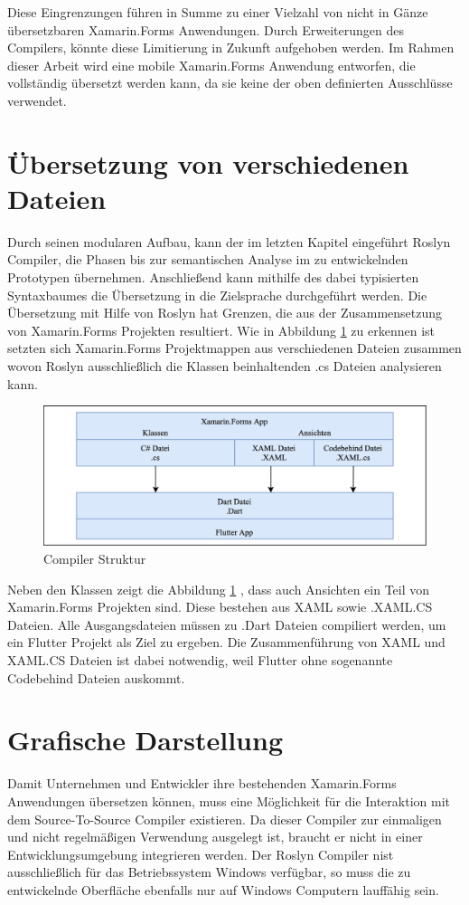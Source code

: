Diese Eingrenzungen führen in Summe zu einer Vielzahl von nicht in Gänze übersetzbaren Xamarin.Forms Anwendungen.  Durch Erweiterungen des Compilers, könnte diese Limitierung in Zukunft aufgehoben werden.  Im Rahmen dieser Arbeit wird eine mobile Xamarin.Forms Anwendung entworfen, die vollständig übersetzt werden kann, da sie keine der oben definierten Ausschlüsse verwendet. 


\section{Übersetzung von verschiedenen Dateien}
Durch seinen modularen Aufbau,  kann der im letzten Kapitel eingeführt Roslyn Compiler,  die Phasen bis zur semantischen Analyse im zu entwickelnden Prototypen übernehmen.  Anschließend kann mithilfe des dabei typisierten Syntaxbaumes die Übersetzung in die Zielsprache durchgeführt werden.   Die Übersetzung mit Hilfe von Roslyn hat Grenzen, die aus der Zusammensetzung von Xamarin.Forms Projekten resultiert.  Wie in Abbildung \ref{fig:CompilerStruktur} zu erkennen ist setzten sich Xamarin.Forms Projektmappen aus verschiedenen Dateien zusammen wovon Roslyn ausschließlich die Klassen beinhaltenden .cs Dateien analysieren kann. 

\begin{figure}[!ht]
 \includegraphics[width=14.5cm]{Images/Compiler/CompilerArchitecture.png}
 \caption{Compiler Struktur}
 \label{fig:CompilerStruktur}
\end{figure}

Neben den Klassen zeigt die Abbildung \ref{fig:CompilerStruktur} , dass auch Ansichten ein Teil von Xamarin.Forms Projekten sind.  Diese bestehen aus XAML sowie .XAML.CS Dateien.  Alle Ausgangsdateien müssen zu .Dart Dateien compiliert werden,  um ein Flutter Projekt als Ziel zu ergeben.  Die Zusammenführung von XAML und XAML.CS Dateien ist dabei notwendig,  weil Flutter ohne sogenannte Codebehind Dateien auskommt. 

\section{Grafische Darstellung}
Damit Unternehmen und Entwickler ihre bestehenden Xamarin.Forms Anwendungen übersetzen können, muss eine Möglichkeit für die Interaktion mit dem Source-To-Source Compiler existieren.  Da dieser Compiler zur einmaligen und nicht regelmäßigen Verwendung ausgelegt ist,  braucht er nicht in einer Entwicklungsumgebung integrieren werden.  Der Roslyn Compiler nist ausschließlich für das  Betriebssystem Windows verfügbar,  so muss die zu entwickelnde Oberfläche ebenfalls nur auf Windows Computern lauffähig sein.  


